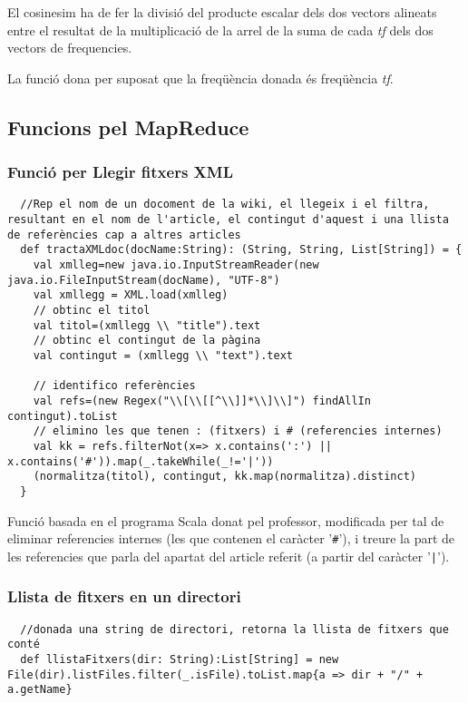 \documentclass[11pt,a4paper,twoside]{report}
\begin{document}
El cosinesim ha de fer la divisió del producte escalar dels dos vectors alineats entre el resultat de la multiplicació de la arrel de la suma de cada \textit{tf} dels dos vectors de frequencies.

La funció dona per suposat que la freqüència donada és freqüència \textit{tf}.

\subsection{Funcions pel MapReduce}

\subsubsection{Funció per Llegir fitxers XML}
\begin{lstlisting}
  //Rep el nom de un docoment de la wiki, el llegeix i el filtra, resultant en el nom de l'article, el contingut d'aquest i una llista de referències cap a altres articles
  def tractaXMLdoc(docName:String): (String, String, List[String]) = {
    val xmlleg=new java.io.InputStreamReader(new java.io.FileInputStream(docName), "UTF-8")
    val xmllegg = XML.load(xmlleg)
    // obtinc el titol
    val titol=(xmllegg \\ "title").text
    // obtinc el contingut de la pàgina
    val contingut = (xmllegg \\ "text").text

    // identifico referències
    val refs=(new Regex("\\[\\[[^\\]]*\\]\\]") findAllIn contingut).toList
    // elimino les que tenen : (fitxers) i # (referencies internes)
    val kk = refs.filterNot(x=> x.contains(':') || x.contains('#')).map(_.takeWhile(_!='|'))
    (normalitza(titol), contingut, kk.map(normalitza).distinct)
  }
\end{lstlisting}

Funció basada en el programa Scala donat pel professor, modificada per tal de eliminar referencies internes
(les que contenen el caràcter '\texttt{\#}'), i treure la part de les referencies que parla del apartat del article referit
(a partir del caràcter '\texttt{|}').


\subsubsection{Llista de fitxers en un directori}
\begin{lstlisting}
  //donada una string de directori, retorna la llista de fitxers que conté
  def llistaFitxers(dir: String):List[String] = new File(dir).listFiles.filter(_.isFile).toList.map{a => dir + "/" + a.getName}
\end{lstlisting}
\end{document}

